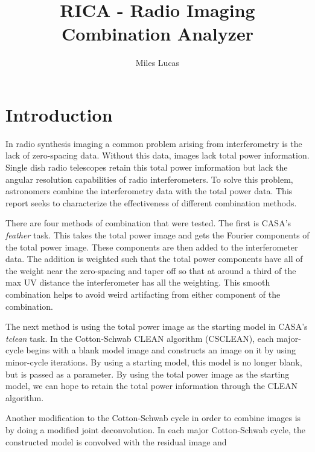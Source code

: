 \documentclass[manuscript,linenumbers]{aastex62}
\begin{document}
\title{RICA - Radio Imaging Combination Analyzer}
\author{Miles Lucas}
 

\begin{abstract}

\end{abstract}

\section{Introduction}

In radio synthesis imaging a common problem arising from interferometry is the lack of zero-spacing data. Without this data, images lack total power information. Single dish radio telescopes retain this total power imformation but lack the angular resolution capabilities of radio interferometers. To solve this problem, astronomers combine the interferometry data with the total power data. This report seeks to characterize the effectiveness of different combination methods.

There are four methods of combination that were tested. The first is CASA's \textit{feather} task. This takes the total power image and gets the Fourier components of the total power image. These components are then added to the interferometer data. The addition is weighted such that the total power components have all of the weight near the zero-spacing and taper off so that at around a third of the max UV distance the interferometer has all the weighting. This smooth combination helps to avoid weird artifacting from either component of the combination.

The next method is using the total power image as the starting model in CASA's \textit{tclean} task. In the Cotton-Schwab CLEAN algorithm (CSCLEAN), each major-cycle begins with a blank model image and constructs an image on it by using minor-cycle iterations. By using a starting model, this model is no longer blank, but is passed as a parameter. By using the total power image as the starting model, we can hope to retain the total power information through the CLEAN algorithm.

Another modification to the Cotton-Schwab cycle in order to combine images is by doing a modified joint deconvolution. In each major Cotton-Schwab cycle, the constructed model is convolved with the residual image and
\end{document}
